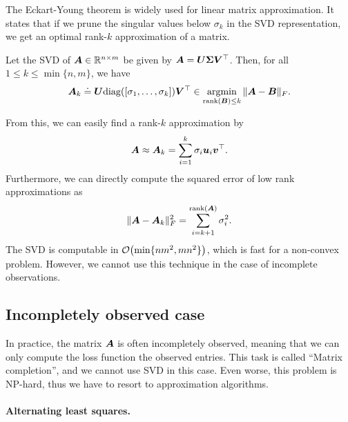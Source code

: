 The Eckart-Young theorem is widely used for linear matrix approximation. It states that if we prune
the singular values below $\sigma_k$ in the SVD representation, we get an optimal rank-$k$
approximation of a matrix.

\begin{theorem}
    Let the SVD of $\bm{A} \in \mathbb{R}^{n \times m}$ be given by $\bm{A} = \bm{U} \bm{\Sigma}
        \bm{V}^\top$. Then, for all $1 \leq k \leq \min\{n, m\}$, we have \[
        \bm{A}_k \doteq \bm{U} \mathrm{diag}([\sigma_1, \ldots, \sigma_k]) \bm{V}^\top \in \operatorname*{argmin}_{\mathrm{rank}(\bm{B}) \leq k} \| \bm{A} - \bm{B} \|_F.
    \]
\end{theorem}

From this, we can easily find a rank-$k$ approximation by \[
    \bm{A} \approx \bm{A}_k = \sum_{i=1}^{k} \sigma_i \bm{u}_i \bm{v}^\top.
\]
Furthermore, we can directly compute the squared error of low rank approximations as \[
    \| \bm{A} - \bm{A}_k \|_F^2 = \sum_{i=k+1}^{\mathrm{rank}(\bm{A})} \sigma_i^2.
\]
The SVD is computable in $\bigo{\min \{ nm^2, mn^2 \}}$, which is fast for a non-convex problem.
However, we cannot use this technique in the case of incomplete observations.

\subsection{Incompletely observed case}

In practice, the matrix $\bm{A}$ is often incompletely observed, meaning that we can only compute
the loss function \wrt the observed entries. This task is called ``Matrix completion'', and we
cannot use SVD in this case. Even worse, this problem is NP-hard, thus we have to resort to
approximation algorithms.

\paragraph{Alternating least squares.}

